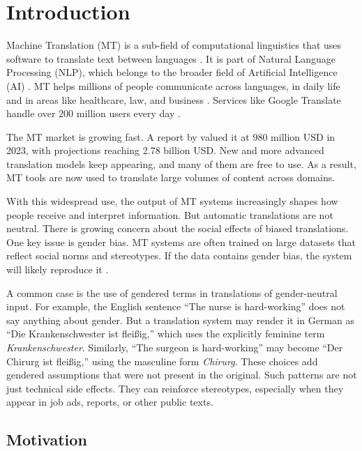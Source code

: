 \chapter{Introduction}
Machine Translation (MT) is a sub-field of computational linguistics that uses software to translate text between languages \citep{linMachineTranslationAcademic2009}. It is part of Natural Language Processing (NLP), which belongs to the broader field of Artificial Intelligence (AI) \citep{smacchiaDoesAIReflect2024}. MT helps millions of people communicate across languages, in daily life and in areas like healthcare, law, and business \citep{kapplAreAllSpanish2025}. Services like Google Translate handle over 200 million users every day \citep{pratesAssessingGenderBias2019,shresthaExploringGenderBiases2022}.

The MT market is growing fast. A report by \citet{skyquestMachineTranslationMT2025} valued it at 980 million USD in 2023, with projections reaching 2.78 billion USD. New and more advanced translation models keep appearing, and many of them are free to use. As a result, MT tools are now used to translate large volumes of content across domains.

With this widespread use, the output of MT systems increasingly shapes how people receive and interpret information. But automatic translations are not neutral. There is growing concern about the social effects of biased translations. One key issue is gender bias. MT systems are often trained on large datasets that reflect social norms and stereotypes. If the data contains gender bias, the system will likely reproduce it \citep{choMeasuringGenderBias2019,soundararajanInvestigatingGenderBias2024,smacchiaDoesAIReflect2024}.

A common case is the use of gendered terms in translations of gender-neutral input. For example, the English sentence “The nurse is hard-working” does not say anything about gender. But a translation system may render it in German as “Die Krankenschwester ist fleißig,” which uses the explicitly feminine term \textit{Krankenschwester}. Similarly, “The surgeon is hard-working” may become “Der Chirurg ist fleißig,” using the masculine form \textit{Chirurg}. These choices add gendered assumptions that were not present in the original. Such patterns are not just technical side effects. They can reinforce stereotypes, especially when they appear in job ads, reports, or other public texts.


\section{Motivation}

